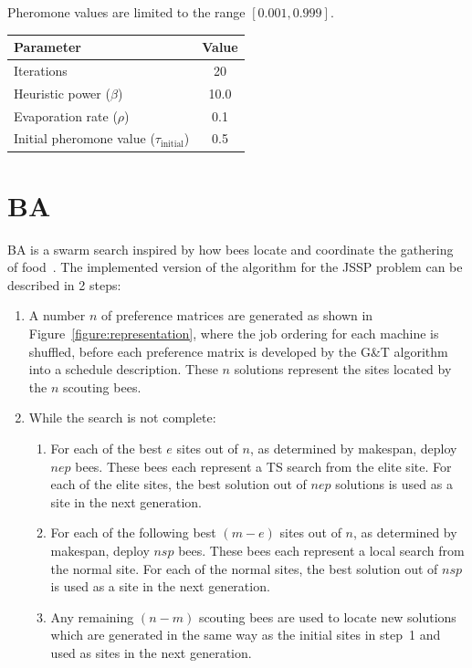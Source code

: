 \documentclass[paper=a4, fontsize=9pt]{scrartcl}
\begin{document}
\begin{multicols}{2}
Pheromone values are limited to the range $[0.001, 0.999]$.

{
\vspace{0.2cm}
\begin{minipage}{\linewidth{}}
\centering
\begin{tabular}{lc}
\toprule
Parameter                                         & Value \\
\midrule
Iterations                                        & 20    \\
Heuristic power ($\beta$)                         & 10.0  \\
Evaporation rate ($\rho$)                         &  0.1  \\
Initial pheromone value ($\tau_{\text{initial}}$) &  0.5  \\
\bottomrule
\end{tabular}
\vspace{-0.2cm}
\label{table:acoparams}
\end{minipage}
}

\section*{\acl{BA}}

\acf{BA} is a swarm search inspired by how bees locate and coordinate the gathering of food~\cite{pham2011bees}. The implemented version of the algorithm for the \ac{JSSP} problem can be described in 2 steps:

\begin{enumerate}
    \item A number $n$ of preference matrices are generated as shown in Figure~\ref{figure:representation}, where the job ordering for each machine is shuffled, before each preference matrix is developed by the G\&T algorithm into a schedule description. These $n$ solutions represent the sites located by the $n$ scouting bees.
    \item While the search is not complete:
    \begin{enumerate}
        \item For each of the best $e$ sites out of $n$, as determined by makespan, deploy $nep$ bees. These bees each represent a \ac{TS} search from the elite site. For each of the elite sites, the best solution out of $nep$ solutions is used as a site in the next generation.
        \item For each of the following best $(m-e)$ sites out of $n$, as determined by makespan, deploy $nsp$ bees. These bees each represent a local search from the normal site. For each of the normal sites, the best solution out of $nsp$ is used as a site in the next generation.
        \item Any remaining $(n-m)$ scouting bees are used to locate new solutions which are generated in the same way as the initial sites in step~1 and used as sites in the next generation.
    \end{enumerate}
\end{enumerate}


\end{multicols}
\end{document}
